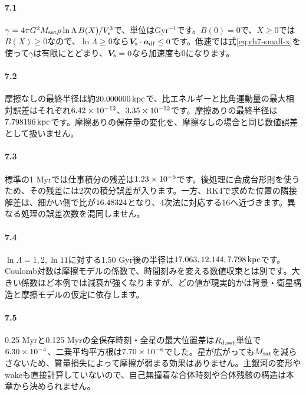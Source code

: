 
\paragraph{7.1}
$\gamma=4\pi G^2M_{\rm sat}\rho\ln\Lambda\,B(X)/V_{\rm s}^3$で、単位は$\mathrm{Gyr^{-1}}$です。$B(0)=0$で、$X\geq0$では$B(X)\geq0$なので、$\ln\Lambda\geq0$なら$\boldsymbol V_{\rm s}\cdot\boldsymbol a_{\rm df}\leq0$です。低速では式\eqref{eq:ch7-small-x}を使って$\gamma$は有限にとどまり、$\boldsymbol V_{\rm s}=0$なら加速度も0になります。

\paragraph{7.2}
摩擦なしの最終半径は約$20.000000\,\mathrm{kpc}$で、比エネルギーと比角運動量の最大相対誤差はそれぞれ$6.42\times 10^{-12}$、$3.35\times 10^{-12}$です。摩擦ありの最終半径は$7.798196\,\mathrm{kpc}$です。摩擦ありの保存量の変化を、摩擦なしの場合と同じ数値誤差として扱いません。

\paragraph{7.3}
標準の1 Myrでは仕事積分の残差は$1.23\times 10^{-5}$です。後処理に合成台形則を使うため、その残差には2次の積分誤差が入ります。一方、RK4で求めた位置の隣接解差は、細かい側で比が$16.48324$となり、4次法に対応する16へ近づきます。異なる処理の誤差次数を混同しません。

\paragraph{7.4}
$\ln\Lambda=1,2,\ln11$に対する1.50 Gyr後の半径は$17.063,12.144,7.798\,\mathrm{kpc}$です。Coulomb対数は摩擦モデルの係数で、時間刻みを変える数値収束とは別です。大きい係数ほど本例では減衰が強くなりますが、どの値が現実的かは背景・衛星構造と摩擦モデルの仮定に依存します。

\paragraph{7.5}
0.25 Myrと0.125 Myrの全保存時刻・全星の最大位置差は$R_{\rm d,sat}$単位で$6.30\times 10^{-4}$、二乗平均平方根は$7.70\times 10^{-6}$でした。星が広がっても$M_{\rm sat}$を減らさないため、質量損失によって摩擦が弱まる効果はありません。主銀河の変形やwakeも直接計算していないので、自己無撞着な合体時刻や合体残骸の構造は本章から決められません。
